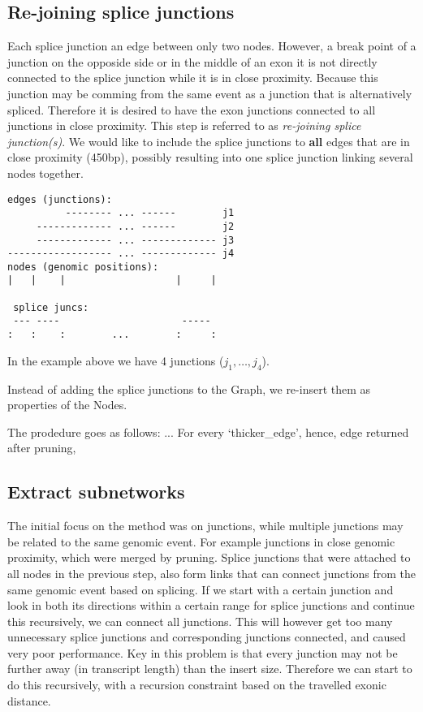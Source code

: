 \documentclass{article}
\theoremstyle{definition}
\begin{document}
\subsection{Re-joining splice junctions}
Each splice junction an edge between only two nodes.
However, a break point of a junction on the opposide side or in the middle of an exon it is not directly connected to the splice junction while it is in close proximity.
Because this junction may be comming from the same event as a junction that is alternatively spliced.
Therefore it is desired to have the exon junctions connected to all junctions in close proximity.
This step is referred to as \textit{re-joining splice junction(s)}.
We would like to include the splice junctions to \textbf{all} edges that are in close proximity (450bp), possibly resulting into one splice junction linking several nodes together.

\begin{verbatim}
edges (junctions):
          -------- ... ------        j1
     ------------- ... ------        j2
     ------------- ... ------------- j3
------------------ ... ------------- j4
nodes (genomic positions):
|   |    |                   |     |

 splice juncs:
 --- ----                     -----
:   :    :        ...        :     :
\end{verbatim}
In the example above we have 4 junctions ($j_1,\ldots,j_4$).

Instead of adding the splice junctions to the Graph, we re-insert them as properties of the Nodes.

The prodedure goes as follows:
...
For every `thicker\_edge', hence, edge returned after pruning, 


\subsection{Extract subnetworks}
The initial focus on the method was on junctions, while multiple junctions may be related to the same genomic event.
For example junctions in close genomic proximity, which were merged by pruning.
Splice junctions that were attached to all nodes in the previous step, also form links that can connect junctions from the same genomic event based on splicing.
If we start with a certain junction and look in both its directions within a certain range for splice junctions and continue this recursively, we can connect all junctions.
This will however get too many unnecessary splice junctions and corresponding junctions connected, and caused very poor performance.
Key in this problem is that every junction may not be further away (in transcript length) than the insert size.
Therefore we can start to do this recursively, with a recursion constraint based on the travelled exonic distance.
\end{document}
